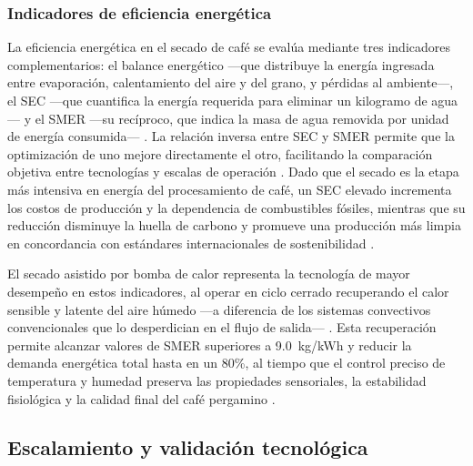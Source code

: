 \subsubsection{Indicadores de eficiencia energética}

La eficiencia energética en el secado de café se evalúa mediante tres indicadores 
complementarios: el balance energético —que distribuye la energía ingresada entre 
evaporación, calentamiento del aire y del grano, y pérdidas al ambiente—, el SEC 
—que cuantifica la energía requerida para eliminar un kilogramo de agua— y el SMER 
—su recíproco, que indica la masa de agua removida por unidad de energía consumida— 
\parencite{burdo_energy-efficient_2025, gomez-daza_innovacion_2023, 
geng_thermodynamically_2023, abbaspour-gilandeh_effect_2021, liu_optimization_2025}. 
La relación inversa entre SEC y SMER permite que la optimización de uno mejore 
directamente el otro, facilitando la comparación objetiva entre tecnologías y escalas 
de operación \parencite{gomez-daza_innovacion_2023, burdo_energy-efficient_2025}. 
Dado que el secado es la etapa más intensiva en energía del procesamiento de café, 
un SEC elevado incrementa los costos de producción y la dependencia de combustibles 
fósiles, mientras que su reducción disminuye la huella de carbono y promueve una 
producción más limpia en concordancia con estándares internacionales de sostenibilidad 
\parencite{cruz-ospina_improving_2026, el-mesery_application_2025-1, 
kaveh_comparative_2023, institute_of_food_and_biotechnology_can_tho_university_vietnam_impact_2022, 
cansee_effect_2026, chojnacka_improvements_2021}.

El secado asistido por bomba de calor representa la tecnología de mayor desempeño 
en estos indicadores, al operar en ciclo cerrado recuperando el calor sensible y 
latente del aire húmedo —a diferencia de los sistemas convectivos convencionales 
que lo desperdician en el flujo de salida— \parencite{bobbo_technological_2024, 
chojnacka_improvements_2021}. Esta recuperación permite alcanzar valores de SMER 
superiores a 9.0~kg/kWh y reducir la demanda energética total hasta en un 80\%, 
al tiempo que el control preciso de temperatura y humedad preserva las propiedades 
sensoriales, la estabilidad fisiológica y la calidad final del café pergamino 
\parencite{burdo_energy-efficient_2025, bobbo_technological_2024, 
el-mesery_application_2025, gomez-daza_innovacion_2023}.

\subsection{Escalamiento y validación tecnológica}

